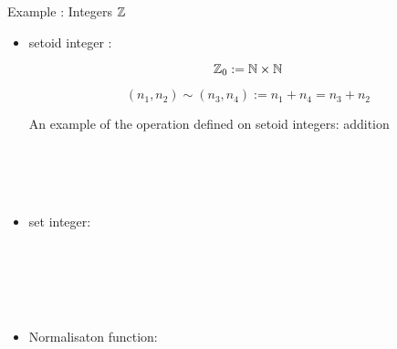 \documentclass[11pt, mathserif,handout]{beamer}
\begin{document}
\begin{frame}[allowframebreaks,t]{Example : Integers $\mathbb{Z}$}

\begin{itemize}
\item setoid integer : 

$$\mathbb{Z}_0 :=\mathbb{N} \times \mathbb{N}$$

$$ (n_1, n_2) \sim (n_3 , n_4)  :=  n_1 + n_4 = n_3 + n_2$$

An example of the operation defined on setoid integers: addition

\begin{code}
\\
\>\AgdaFunction{\_+\_} \AgdaSymbol{:}     \<%
\\
\>\AgdaSymbol{(} \AgdaInductiveConstructor{,} \AgdaSymbol{)} \AgdaFunction{+} \AgdaSymbol{(} \AgdaInductiveConstructor{,} \AgdaSymbol{)} \AgdaSymbol{=} \AgdaSymbol{(}  \AgdaSymbol{)} \AgdaInductiveConstructor{,} \AgdaSymbol{(}  \AgdaSymbol{)}\<%
\\
\end{code}

\item set integer:

\begin{code}
\\
\>  \AgdaSymbol{:}  \<%
\\
\>[0]\<[2]%
\>[2]\AgdaInductiveConstructor{+\_} \<[8]%
\>[8]\AgdaSymbol{:}   \<%
\\
\>[0]\<[2]%
\>[2] \AgdaSymbol{:}   \<%
\\
\>\<\end{code}

\item Normalisaton function:

\begin{code}
\>\AgdaFunction{[\_]} \<[18]%
\>[18]\AgdaSymbol{:}   \<%
\\
\>\AgdaFunction{[}  \AgdaInductiveConstructor{,}  \AgdaFunction{]} \<[18]%
\>[18]\AgdaSymbol{=} \AgdaInductiveConstructor{+} \<%
\\
\>\AgdaFunction{[}  \AgdaInductiveConstructor{,}   \AgdaFunction{]} \<[18]%
\>[18]\AgdaSymbol{=}  \<%
\\
\>\AgdaFunction{[}   \AgdaInductiveConstructor{,}   \AgdaFunction{]} \AgdaSymbol{=} \AgdaFunction{[}  \AgdaInductiveConstructor{,}  \AgdaFunction{]}\<%
\end{code}


\end{itemize}
\end{frame}
\end{document}

